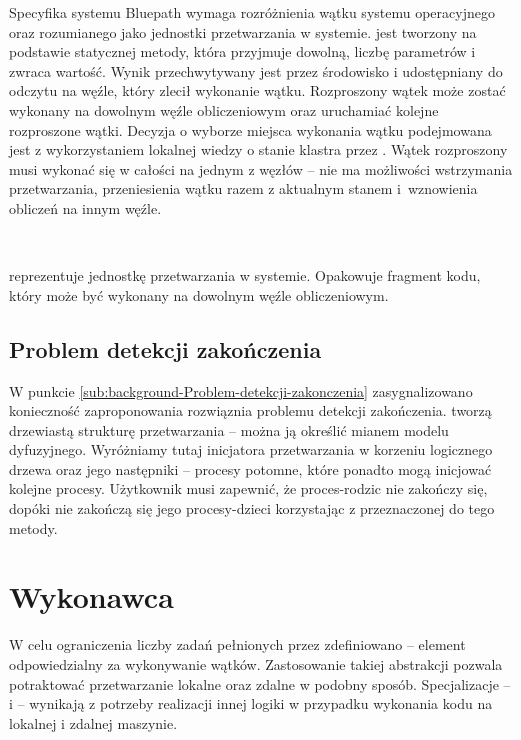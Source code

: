 Specyfika systemu Bluepath wymaga rozróżnienia wątku systemu operacyjnego
oraz  rozumianego jako jednostki przetwarzania
w systemie.  jest tworzony na podstawie
statycznej metody, która przyjmuje dowolną, liczbę parametrów i zwraca
wartość. Wynik przechwytywany jest przez środowisko i udostępniany
do odczytu na węźle, który zlecił wykonanie wątku. Rozproszony wątek
może zostać wykonany na dowolnym węźle obliczeniowym oraz uruchamiać
kolejne rozproszone wątki. Decyzja o wyborze miejsca wykonania wątku
podejmowana jest z wykorzystaniem lokalnej wiedzy o stanie klastra
przez . Wątek rozproszony musi wykonać się w całości
na jednym z węzłów -- nie ma możliwości wstrzymania przetwarzania,
przeniesienia wątku razem z aktualnym stanem i~wznowienia obliczeń
na innym węźle.
\begin{defn}
~

\noindent \label{def:background-Rozproszony-watek}
reprezentuje jednostkę przetwarzania w systemie. Opakowuje fragment
kodu, który może być wykonany na dowolnym węźle obliczeniowym.
\end{defn}

\subsection{Problem detekcji zakończenia}

W punkcie \ref{sub:background-Problem-detekcji-zakonczenia} zasygnalizowano
konieczność zaproponowania rozwiąznia problemu detekcji zakończenia.
 tworzą drzewiastą strukturę przetwarzania
-- można ją określić mianem modelu dyfuzyjnego. Wyróżniamy tutaj inicjatora
przetwarzania w korzeniu logicznego drzewa oraz jego następniki --
procesy potomne, które ponadto mogą inicjować kolejne procesy. Użytkownik
musi zapewnić, że proces-rodzic nie zakończy się, dopóki nie zakończą
się jego procesy-dzieci korzystając z przeznaczonej do tego metody.


\section{Wykonawca}

W celu ograniczenia liczby zadań pełnionych przez 
zdefiniowano  -- element odpowiedzialny za wykonywanie
wątków. Zastosowanie takiej abstrakcji pozwala potraktować przetwarzanie
lokalne oraz zdalne w podobny sposób. Specjalizacje -- 
i  -- wynikają z potrzeby realizacji innej
logiki w przypadku wykonania kodu na lokalnej i zdalnej maszynie. 


